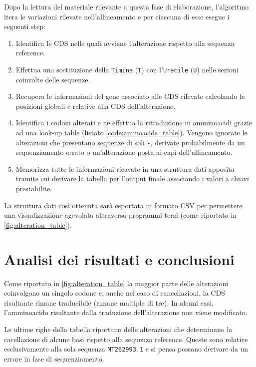 \documentclass[11pt,italian]{article}
\begin{document}
\noindent
Dopo la lettura del materiale rilevante a questa fase di elaborazione, l'algoritmo itera le variazioni rilevate nell'allineamento e per ciascuna di esse esegue i seguenti step:
\begin{enumerate}
  \item Identifica le CDS nelle quali avviene l'alterazione rispetto alla sequenza reference.
  \item Effettua una sostituzione della \lstinline{Timina} (\lstinline{T}) con l'\lstinline{Uracile} (\lstinline{U}) nelle sezioni coinvolte delle sequenze.
  \item Recupera le informazioni del gene associato alle CDS rilevate calcolando le posizioni globali e relative alla CDS dell'alterazione.
  \item Identifica i codoni alterati e ne effettua la ritraduzione in amminoacidi grazie ad una look-up table (listato \ref{code:aminoacids_table}). Vengono ignorate le alterazioni che presentano sequenze di soli \lstinline{-}, derivate probabilmente da un sequenziamento errato o un'alterazione posta ai capi dell'allineamento.
  \item Memorizza tutte le informazioni ricavate in una struttura dati apposita tramite cui derivare la tabella per l'output finale associando i valori a chiavi prestabilite.
\end{enumerate}

\noindent
La struttura dati così ottenuta sarà esportata in formato CSV per permettere una visualizzazione agevolata attraverso programmi terzi (come riportato in \cref{fig:alteration_table}).

\newpage
\section{Analisi dei risultati e conclusioni}
Come riportato in \cref{fig:alteration_table} la maggior parte delle alterazioni coinvolgono un singolo codone e, anche nel caso di cancellazioni, la CDS risultante rimane traducibile (rimane multipla di tre). In alcuni casi, l'amminoacido risultante dalla traduzione dell'alterazione non viene modificato.

Le ultime righe della tabella riportano delle alterazioni che determinano la cacellazione di alcune basi rispetto alla sequenza reference.
Queste sono relative esclusivamente alla sola sequenza \lstinline{MT262993.1} e si pensa possano derivare da un errore in fase di sequenziamento.
\end{document}
